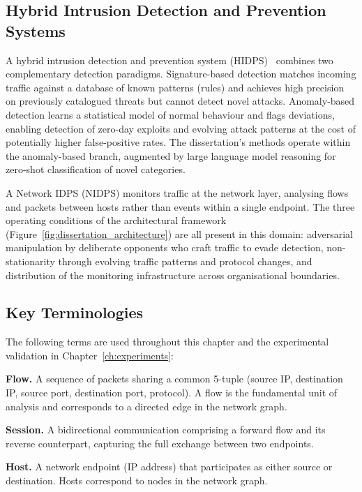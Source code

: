 \subsection{Hybrid Intrusion Detection and Prevention Systems}

A hybrid intrusion detection and prevention system (HIDPS)~\cite{Buczak2016,Ahmad2021,Aldweesh2020,Ferrag2020,Paxson1999} combines two complementary detection paradigms. Signature-based detection matches incoming traffic against a database of known patterns (rules) and achieves high precision on previously catalogued threats but cannot detect novel attacks. Anomaly-based detection learns a statistical model of normal behaviour and flags deviations, enabling detection of zero-day exploits and evolving attack patterns at the cost of potentially higher false-positive rates. The dissertation's methods operate within the anomaly-based branch, augmented by large language model reasoning for zero-shot classification of novel categories.

A Network IDPS (NIDPS) monitors traffic at the network layer, analysing flows and packets between hosts rather than events within a single endpoint. The three operating conditions of the architectural framework (Figure~\ref{fig:dissertation_architecture}) are all present in this domain: adversarial manipulation by deliberate opponents who craft traffic to evade detection, non-stationarity through evolving traffic patterns and protocol changes, and distribution of the monitoring infrastructure across organisational boundaries.


\subsection{Key Terminologies}

The following terms are used throughout this chapter and the experimental validation in Chapter~\ref{ch:experiments}:

\noindent\textbf{Flow.} A sequence of packets sharing a common 5-tuple (source IP, destination IP, source port, destination port, protocol). A flow is the fundamental unit of analysis and corresponds to a directed edge in the network graph.

\noindent\textbf{Session.} A bidirectional communication comprising a forward flow and its reverse counterpart, capturing the full exchange between two endpoints.

\noindent\textbf{Host.} A network endpoint (IP address) that participates as either source or destination. Hosts correspond to nodes in the network graph.

